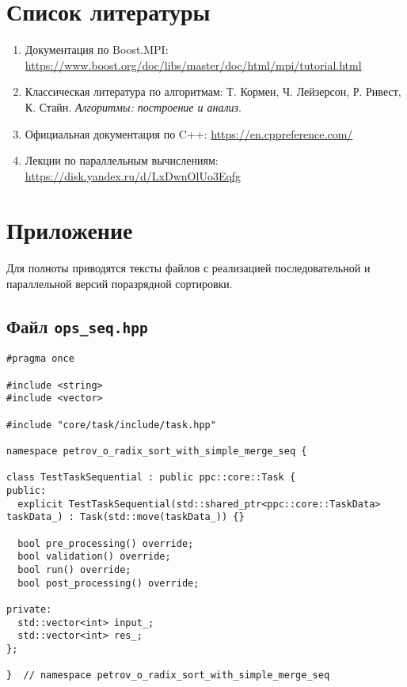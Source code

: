 \documentclass[12pt]{article}
\begin{document}

\section{Список литературы}
\begin{enumerate}
  \item Документация по Boost.MPI: \url{https://www.boost.org/doc/libs/master/doc/html/mpi/tutorial.html}
  \item Классическая литература по алгоритмам: Т. Кормен, Ч. Лейзерсон, Р. Ривест, К. Стайн. \textit{Алгоритмы: построение и анализ}.
  \item Официальная документация по C++: \url{https://en.cppreference.com/}
  \item Лекции по параллельным вычислениям: \url{https://disk.yandex.ru/d/LxDwnOlUo3Eqfg}
\end{enumerate}

\appendix
\section*{Приложение}

Для полноты приводятся тексты файлов с реализацией последовательной и параллельной версий поразрядной сортировки.

\subsection*{Файл \texttt{ops\_seq.hpp}}

\begin{lstlisting}[caption={Последовательная версия поразрядной сортировки}]
#pragma once

#include <string>
#include <vector>

#include "core/task/include/task.hpp"

namespace petrov_o_radix_sort_with_simple_merge_seq {

class TestTaskSequential : public ppc::core::Task {
public:
  explicit TestTaskSequential(std::shared_ptr<ppc::core::TaskData> taskData_) : Task(std::move(taskData_)) {}

  bool pre_processing() override;
  bool validation() override;
  bool run() override;
  bool post_processing() override;

private:
  std::vector<int> input_;
  std::vector<int> res_;
};

}  // namespace petrov_o_radix_sort_with_simple_merge_seq
\end{lstlisting}
\end{document}
